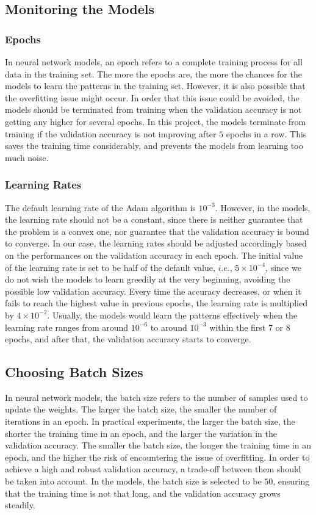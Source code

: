 \documentclass[11pt,twoside]{article}
\numberwithin{Theorem}{section}
\numberwithin{Definition}{section}
\numberwithin{Lemma}{section}
\numberwithin{Algorithm}{section}
\numberwithin{equation}{section}
\begin{document}
\subsection{Monitoring the Models}

\subsubsection{Epochs}
In neural network models, an epoch refers to a complete training process for all data in the training set. The more the epochs are, the more the chances for the models to learn the patterns in the training set. However, it is also possible that the overfitting issue might occur. In order that this issue could be avoided, the models should be terminated from training when the validation accuracy is not getting any higher for several epochs. In this project, the models terminate from training if the validation accuracy is not improving after $5$ epochs in a row. This saves the training time considerably, and prevents the models from learning too much noise.

\subsubsection{Learning Rates}
The default learning rate of the Adam algorithm is $10^{-3}$. However, in the models, the learning rate should not be a constant, since there is neither guarantee that the problem is a convex one, nor guarantee that the validation accuracy is bound to converge. In our case, the learning rates should be adjusted accordingly based on the performances on the validation accuracy in each epoch. The initial value of the learning rate is set to be half of the default value, $i.e.$, $5 \times 10^{-4}$, since we do not wish the models to learn greedily at the very beginning, avoiding the possible low validation accuracy. Every time the accuracy decreases, or when it fails to reach the highest value in previous epochs, the learning rate is multiplied by $4 \times 10 ^ {-2}$. Usually, the models would learn the patterns effectively when the learning rate ranges from around $10^{-6}$ to around $10^{-3}$ within the first $7$ or $8$ epochs, and after that, the validation accuracy starts to converge.

\subsection{Choosing Batch Sizes}
In neural network models, the batch size refers to the number of samples used to update the weights. The larger the batch size, the smaller the number of iterations in an epoch. In practical experiments, the larger the batch size, the shorter the training time in an epoch, and the larger the variation in the validation accuracy. The smaller the batch size, the longer the training time in an epoch, and the higher the risk of encountering the issue of overfitting. In order to achieve a high and robust validation accuracy, a trade-off between them should be taken into account. In the models, the batch size is selected to be $50$, ensuring that the training time is not that long, and the validation accuracy grows steadily. 
\end{document}
